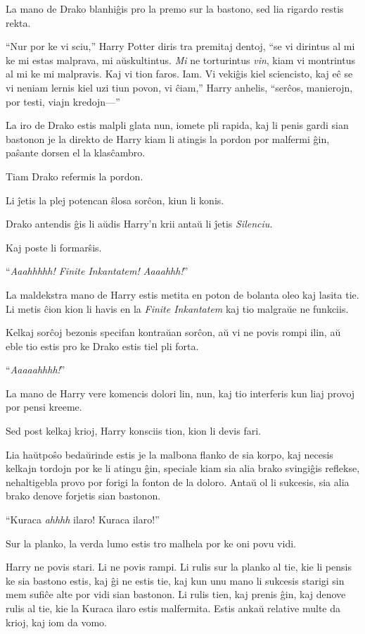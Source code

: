 La mano de Drako blanhiĝis pro la premo sur la bastono, sed lia rigardo restis rekta.

``Nur por ke vi sciu,'' Harry Potter diris tra premitaj dentoj, ``se
vi dirintus al mi ke mi estas malprava, mi aŭskultintus. \emph{Mi} ne
torturintus \emph{vin}, kiam vi montrintus al mi ke mi malpravis. Kaj
vi tion faros. Iam. Vi vekiĝis kiel sciencisto, kaj eĉ se vi neniam
lernis kiel uzi tiun povon, vi ĉiam,'' Harry anhelis, ``serĉos,
manierojn, por testi, viajn kredojn—''

La iro de Drako estis malpli glata nun, iomete pli rapida, kaj li
penis gardi sian bastonon je la direkto de Harry kiam li atingis la
pordon por malfermi ĝin, paŝante dorsen el la klasĉambro.

Tiam Drako refermis la pordon.

Li ĵetis la plej potencan ŝlosa sorĉon, kiun li konis.

Drako antendis ĝis li aŭdis Harry'n krii antaŭ li ĵetis \emph{Silenciu.}

Kaj poste li formarŝis.

\later

“\emph{Aaahhhhh! Finite Inkantatem! Aaaahhh!}”

La maldekstra mano de Harry estis metita en poton de bolanta oleo kaj
lasita tie. Li metis ĉion kion li havis en la \emph{Finite Inkantatem}
kaj tio malgraŭe ne funkciis.

Kelkaj sorĉoj bezonis specifan kontraŭan sorĉon, aŭ vi ne povis rompi
ilin, aŭ eble tio estis pro ke Drako estis tiel pli forta.

“\emph{Aaaaahhhh!}”

La mano de Harry vere komencis dolori lin, nun, kaj tio interferis kun liaj provoj por pensi kreeme.

Sed post kelkaj krioj, Harry konsciis tion, kion li devis fari.

Lia haŭtpoŝo bedaŭrinde estis je la malbona flanko de sia korpo, kaj
necesis kelkajn tordojn por ke li atingu ĝin, speciale kiam sia alia
brako svingiĝis reflekse, nehaltigebla provo por forigi la fonton de
la doloro. Antaŭ ol li sukcesis, sia alia brako denove forjetis sian
bastonon.

``Kuraca \emph{ahhhh} ilaro! Kuraca ilaro!''

Sur la planko, la verda lumo estis tro malhela por ke oni povu vidi.

Harry ne povis stari. Li ne povis rampi. Li rulis sur la planko al
tie, kie li pensis ke sia bastono estis, kaj ĝi ne estis tie, kaj kun
unu mano li sukcesis starigi sin mem sufiĉe alte por vidi sian
bastonon. Li rulis tien, kaj prenis ĝin, kaj denove rulis al tie, kie
la Kuraca ilaro estis malfermita. Estis ankaŭ relative multe da krioj,
kaj iom da vomo.

